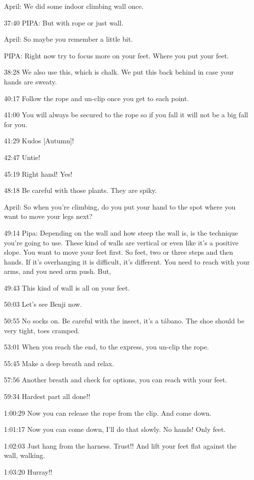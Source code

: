 April: We did some indoor climbing wall once.

37:40 PIPA: But with rope or just wall.

April: So maybe you remember a little bit.

PIPA: Right now try to focus more on your feet. Where you put your feet.

38:28 We also use this, which is chalk. We put this back behind in case
your hands are sweaty.

40:17 Follow the rope and un-clip once you get to each point.

41:00 You will always be secured to the rope so if you fall it will not
be a big fall for you.

41:29 Kudos {[}Autumn{]}!

42:47 Untie!

45:19 Right hand! Yes!

48:18 Be careful with those plants. They are spiky.

April: So when you're climbing, do you put your hand to the spot where
you want to move your legs next?

49:14 Pipa: Depending on the wall and how steep the wall is, is the
technique you're going to use. These kind of walls are vertical or even
like it's a positive slope. You want to move your feet first. So feet,
two or three steps and then hands. If it's overhanging it is difficult,
it's different. You need to reach with your arms, and you need arm push.
But,

49:43 This kind of wall is all on your feet.

50:03 Let's see Benji now.

50:55 No socks on. Be careful with the insect, it's a tábano. The shoe
should be very tight, toes cramped.

53:01 When you reach the end, to the express, you un-clip the rope.

55:45 Make a deep breath and relax.

57:56 Another breath and check for options, you can reach with your
feet.

59:34 Hardest part all done!!

1:00:29 Now you can release the rope from the clip. And come down.

1:01:17 Now you can come down, I'll do that slowly. No hands! Only feet.

1:02:03 Just hang from the harness. Trust!! And lift your feet flat
against the wall, walking.

1:03:20 Hurray!!

